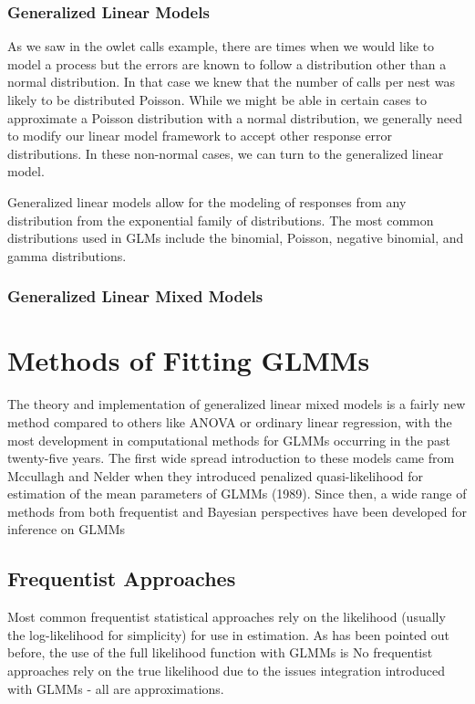\documentclass{article}\usepackage[]{graphicx}\usepackage[]{color}
\begin{document}
\subsubsection{Generalized Linear Models}

As we saw in the owlet calls example, there are times when we would like to model a process but the errors are known to follow a distribution other than a normal distribution. In that case we knew that the number of calls per nest was likely to be distributed Poisson. While we might be able in certain cases to approximate a Poisson distribution with a normal distribution, we generally need to modify our linear model framework to accept other response error distributions. In these non-normal cases, we can turn to the generalized linear model.

Generalized linear models allow for the modeling of responses from any distribution from the exponential family of distributions. The most common distributions used in GLMs include the binomial, Poisson, negative binomial, and gamma distributions. 

\subsubsection{Generalized Linear Mixed Models}



\section{Methods of Fitting GLMMs}

The theory and implementation of generalized linear mixed models is a fairly new method compared to others like ANOVA or ordinary linear regression, with the most development in computational methods for GLMMs occurring in the past twenty-five years. The first wide spread introduction to these models came from Mccullagh and Nelder when they introduced penalized quasi-likelihood for estimation of the mean parameters of GLMMs (1989). Since then, a wide range of methods from both frequentist and Bayesian perspectives have been developed for inference on GLMMs 

\subsection{Frequentist Approaches}

Most common frequentist statistical approaches rely on the likelihood (usually the log-likelihood for simplicity) for use in estimation. As has been pointed out before, the use of the full likelihood function with GLMMs is  No frequentist approaches rely on the true likelihood due to the issues integration introduced with GLMMs - all are approximations. 
\end{document}
